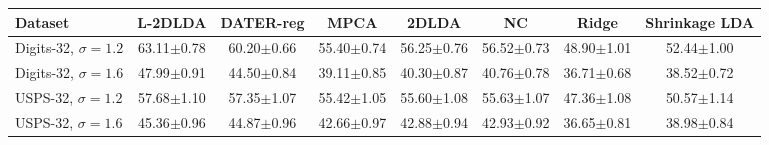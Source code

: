 \begin{tabular}{lccccccc}
\toprule
Dataset & L-2DLDA & DATER-reg & MPCA & 2DLDA & NC & Ridge & Shrinkage LDA \\
\midrule
Digits-32, $\sigma=1.2$ & 63.11$\pm$0.78 & 60.20$\pm$0.66 & 55.40$\pm$0.74 & 56.25$\pm$0.76 & 56.52$\pm$0.73 & 48.90$\pm$1.01 & 52.44$\pm$1.00 \\
Digits-32, $\sigma=1.6$ & 47.99$\pm$0.91 & 44.50$\pm$0.84 & 39.11$\pm$0.85 & 40.30$\pm$0.87 & 40.76$\pm$0.78 & 36.71$\pm$0.68 & 38.52$\pm$0.72 \\
USPS-32, $\sigma=1.2$ & 57.68$\pm$1.10 & 57.35$\pm$1.07 & 55.42$\pm$1.05 & 55.60$\pm$1.08 & 55.63$\pm$1.07 & 47.36$\pm$1.08 & 50.57$\pm$1.14 \\
USPS-32, $\sigma=1.6$ & 45.36$\pm$0.96 & 44.87$\pm$0.96 & 42.66$\pm$0.97 & 42.88$\pm$0.94 & 42.93$\pm$0.92 & 36.65$\pm$0.81 & 38.98$\pm$0.84 \\
\bottomrule
\end{tabular}
